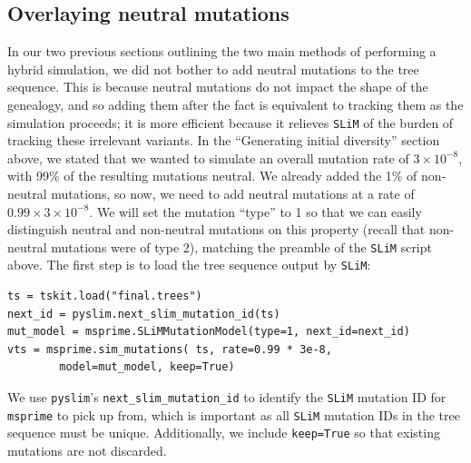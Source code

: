 \documentclass[12pt]{article}
\newcommand{\msprime}[0]{\texttt{msprime}\xspace}
\newcommand{\slim}[0]{\texttt{SLiM}\xspace}
\newcommand{\pyslim}[0]{\texttt{pyslim}\xspace}
\begin{document}
\subsection{Overlaying neutral mutations}
In our two previous sections outlining the two main methods of performing a hybrid simulation, we did not bother to add neutral mutations to the tree sequence.
This is because neutral mutations do not impact the shape of the genealogy, and so adding them after the fact is equivalent to tracking them as the
simulation proceeds;
it is more efficient because it relieves \slim of the burden of tracking these irrelevant variants.
In the ``Generating initial diversity'' section above, we stated that we wanted to simulate an overall mutation rate of $3 \times 10^{-8}$,
with 99\% of the resulting mutations neutral.
We already added the 1\% of non-neutral mutations, so now, we need to add neutral mutations at a rate of $0.99 \times 3 \times10^{-8}$.
We will set the mutation ``type'' to 1 so that we can easily distinguish neutral and non-neutral
mutations on this property (recall that non-neutral mutations were of type 2),
matching the preamble of the \slim script above.
The first step is to load the tree sequence output by \slim:
\begin{verbatim}
ts = tskit.load("final.trees")
next_id = pyslim.next_slim_mutation_id(ts)
mut_model = msprime.SLiMMutationModel(type=1, next_id=next_id)
vts = msprime.sim_mutations( ts, rate=0.99 * 3e-8,
        model=mut_model, keep=True)
\end{verbatim}
We use \pyslim's \verb|next_slim_mutation_id| to identify the \slim mutation ID for \msprime to pick up from,
which is important as all \slim mutation IDs in the tree sequence must be unique.
Additionally, we include \verb|keep=True| so that existing mutations are not discarded.
\end{document}
